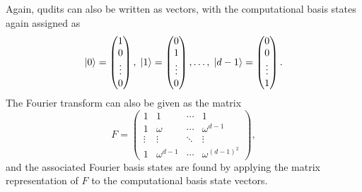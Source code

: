 Again, qudits can also be written as vectors, with the computational basis states again assigned as
\begin{equation}
    \ket{0} = 
    \begin{pmatrix}
        1 \\
        0 \\
        \vdots\\
        0
    \end{pmatrix}, \;
    \ket{1} = 
    \begin{pmatrix}
        0 \\
        1 \\
        \vdots \\
        0
    \end{pmatrix}, \dots, \;
    \ket{d - 1} =
    \begin{pmatrix}
        0 \\
        0 \\
        \vdots \\
        1
    \end{pmatrix}.
\end{equation}
The Fourier transform can also be given as the matrix
\begin{equation}
    F = \begin{pmatrix}
        1 & 1 & \cdots & 1\\
        1 & \omega & \cdots & \omega^{d-1}\\
        \vdots & \vdots & \ddots & \vdots\\
        1 & \omega^{d-1} & \cdots & \omega^{{(d-1)}^2}
    \end{pmatrix},
\end{equation}
and the associated Fourier basis states are found by applying the matrix representation of $F$ to the computational basis state vectors.

